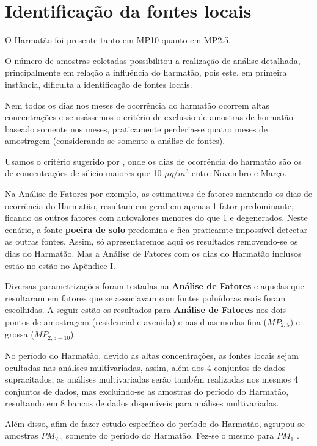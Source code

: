 \section{Identificação da fontes locais}

O Harmatão foi presente tanto em MP10 quanto em MP2.5.


O número de amostras coletadas possibilitou a realização de
análise detalhada, principalmente em relação a influência do harmatão, 
pois este, em primeira instância, dificulta a identificação de fontes locais.
 
Nem todos os dias nos meses de ocorrência do harmatão ocorrem 
altas concentrações e se usássemos o critério de exclusão de amostras
de hormatão baseado somente nos meses, praticamente perderia-se quatro
meses de amostragem (considerando-se somente a análise de fontes). 
 
Usamos o critério sugerido por \cite{aboh2009}, onde os dias de ocorrência 
do harmatão são os de concentrações de sílicio maiores que 10 $\mu g/m^3$
entre Novembro e Março.

Na Análise de Fatores por exemplo, as estimativas de fatores 
mantendo os dias de ocorrência do Harmatão, resultam em geral em apenas 
1 fator predominante, ficando os outros fatores com autovalores
menores do que 1 e degenerados. Neste cenário, a fonte 
\textbf{poeira de solo} predomina e fica praticamte impossível
detectar as outras fontes. Assim, só apresentaremos aqui os resultados 
removendo-se os dias do Harmatão. Mas a Análise de Fatores com os
dias do Harmatão inclusos estão no estão no Apêndice I.

Diversas parametrizações foram testadas na \textbf{Análise de Fatores}
e aquelas que resultaram em fatores que se associavam com fontes poluídoras
reais foram escolhidas. A seguir estão os resultados para 
\textbf{Análise de Fatores} nos dois pontos de amostragem 
(residencial e avenida) e nas duas modas
fina ($MP_{2,5}$) e grossa ($MP_{2,5-10}$).

No período do Harmatão, devido as altas concentrações, as fontes locais sejam 
ocultadas nas análises multivariadas, assim, além dos 4 conjuntos de dados 
supracitados, as análises multivariadas serão também realizadas nos mesmos 4 
conjuntos de dados, mas excluindo-se as amostras do período do Harmatão, 
resultando em 8 bancos de dados disponíveis para análises multivariadas. 

Além disso, afim de fazer estudo específico do período do 
Harmatão, agrupou-se amostras $PM_{2.5}$ somente do período do Harmatão. 
Fez-se o mesmo para $PM_{10}$.  

